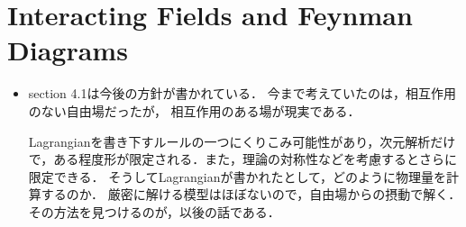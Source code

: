\section{Interacting Fields and Feynman Diagrams}
\begin{itemize}
	\item section 4.1は今後の方針が書かれている．
		今まで考えていたのは，相互作用のない自由場だったが，
		相互作用のある場が現実である．

		Lagrangianを書き下すルールの一つにくりこみ可能性があり，次元解析だけで，ある程度形が限定される．また，理論の対称性などを考慮するとさらに限定できる．
		そうしてLagrangianが書かれたとして，どのように物理量を計算するのか．
		厳密に解ける模型はほぼないので，自由場からの摂動で解く．その方法を見つけるのが，以後の話である．
\end{itemize}
